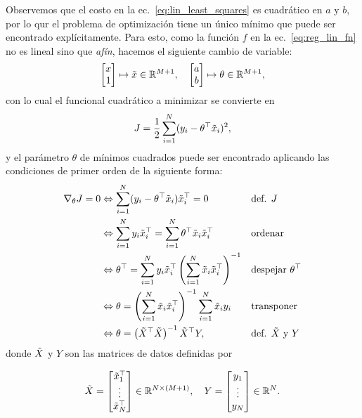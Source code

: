 Observemos que el costo en la  ec.~\eqref{eq:lin_least_squares} es cuadrático en $a$ y $b$, por lo qur  el problema de optimización tiene un único mínimo que puede ser encontrado explícitamente. Para esto, como la función $f$ en la ec.~\eqref{eq:reg_lin_fn} no es lineal sino que \emph{afín}, hacemos el siguiente cambio de variable:
\begin{equation}
  \left[ \begin{matrix}x \\  1\end{matrix}\right] \mapsto \tilde{x}\in{\mathbb R}^{M+1},\quad
  \left[ \begin{matrix}a \\  b\end{matrix}\right]\mapsto \theta\in{\mathbb R}^{M+1},
 \label{eq:truco_reg_lin} 
\end{equation}
con lo cual el funcional cuadrático a minimizar se convierte en
\begin{equation}
	J = \frac{1}{2}\sum_{i=1}^N(y_i-\theta^
	\top \tilde{x}_i)^2,
	\label{eq:lin_least_squares2}
\end{equation} 
y el parámetro $\theta$ de mínimos cuadrados puede ser encontrado aplicando las condiciones de primer orden de la siguiente forma:
\begin{align}
\nabla_\theta J=0 &\Leftrightarrow \sum_{i=1}^N(y_i-\theta^\top \tilde{x}_i)\tilde{x}_i^\top=0  							&&\text{def. $J$}\nonumber\\  
&\Leftrightarrow \sum_{i=1}^Ny_i\tilde{x}_i^\top = \sum_{i=1}^N\theta^\top \tilde{x}_i\tilde{x}_i^\top					&&\text{ordenar}\nonumber\\
&\Leftrightarrow \theta^\top = \sum_{i=1}^Ny_i\tilde{x}_i^\top \left(\sum_{i=1}^N \tilde{x}_i\tilde{x}_i^\top\right)^{-1}	&&\text{despejar $\theta^\top$}\nonumber\\
&\Leftrightarrow \theta =  \left(\sum_{i=1}^N \tilde{x}_i\tilde{x}_i^\top\right)^{-1} \sum_{i=1}^N \tilde{x}_i y_i 		&&\text{transponer}\nonumber\\
&\Leftrightarrow \theta = \left(\tilde{X}^\top\tilde{X} \right)^{-1} \tilde{X}^\top Y, 											&&\text{def. $\tilde{X}$ y $Y$} \label{eq:sol_mse}
\end{align}
donde $\tilde{X}$ y $Y$ son las matrices de datos definidas por

\begin{equation}
  \tilde{X} = \left[ \begin{matrix}\tilde{x}_1^\top \\\vdots \\ \tilde{x}_N^\top \end{matrix}\right]\in{\mathbb R}^{N\times (M+1)} ,\quad
  Y = \left[ \begin{matrix}y_1 \\\vdots \\y_N \end{matrix}\right] \in{\mathbb R}^{N}.
 \label{eq:matrices_X} 
\end{equation}

